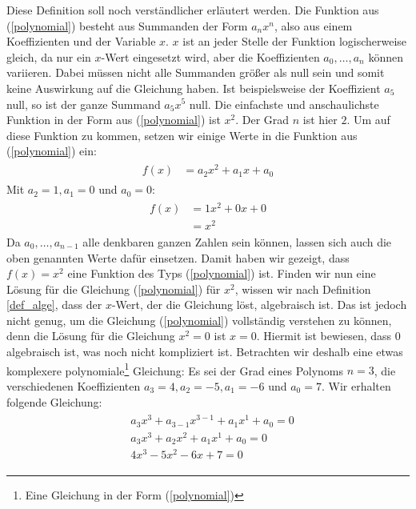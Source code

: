 \documentclass[11pt]{article}
\begin{document}
Diese Definition soll noch verständlicher erläutert werden. Die Funktion aus (\ref{polynomial}) besteht aus Summanden der Form $a_nx^n$, also aus einem Koeffizienten und der Variable $x$. $x$ ist an jeder Stelle der Funktion logischerweise gleich, da nur ein $x$-Wert eingesetzt wird, aber die Koeffizienten $a_0,\dots,a_n$ können variieren. Dabei müssen nicht alle Summanden größer als null sein und somit keine Auswirkung auf die Gleichung haben. Ist beispielsweise der Koeffizient $a_5$ null, so ist der ganze Summand $a_5x^5$ null. Die einfachste und anschaulichste Funktion in der Form aus (\ref{polynomial}) ist $x^2$. Der Grad $n$ ist hier $2$. Um auf diese Funktion zu kommen, setzen wir einige Werte in die Funktion aus (\ref{polynomial}) ein: \begin{align*}
    \begin{split}
        f(x) &=a_2x^2+a_1x+a_0
    \end{split}
\end{align*}
Mit $a_2=1,a_1=0$ und $a_0=0$:
\begin{align*}
    \begin{split}
        f(x) &=1x^2+0x+0 \\
        &= x^2
    \end{split}
\end{align*}
Da $a_0,\dots,a_{n-1}$ alle denkbaren ganzen Zahlen sein können, lassen sich auch die oben genannten Werte dafür einsetzen. Damit haben wir gezeigt, dass $f(x)=x^2$ eine Funktion des Typs (\ref{polynomial}) ist. Finden wir nun eine Lösung für die Gleichung (\ref{polynomial}) für $x^2$, wissen wir nach Definition \ref{def_alge}, dass der $x$-Wert, der die Gleichung löst, algebraisch ist. Das ist jedoch nicht genug, um die Gleichung (\ref{polynomial}) vollständig verstehen zu können, denn die Lösung für die Gleichung \(x^2=0\) ist $x=0$. Hiermit ist bewiesen, dass $0$ algebraisch ist, was noch nicht kompliziert ist. Betrachten wir deshalb eine etwas komplexere polynomiale\footnote{Eine Gleichung in der Form (\ref{polynomial})} Gleichung: Es sei der Grad eines Polynoms $n=3$, die verschiedenen Koeffizienten $a_3=4, a_2=-5, a_1=-6$ und $a_0=7$. Wir erhalten folgende Gleichung: \begin{align}\label{polynomial2}
    \begin{split}
        &a_3x^3+a_{3-1}x^{3-1}+a_{1}x^{1}+a_0 = 0 \\
        &a_3x^3+a_{2}x^{2}+a_{1}x^{1}+a_0 = 0 \\
        &4x^3-5x^2-6x+7 = 0 
    \end{split}
\end{align}
\end{document}
